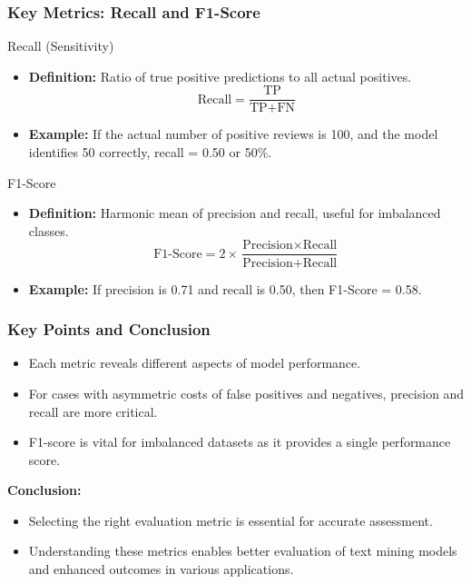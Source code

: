 \documentclass[aspectratio=169]{beamer}
\begin{document}
\begin{frame}[fragile]
    \frametitle{Key Metrics: Recall and F1-Score}
    \begin{block}{Recall (Sensitivity)}
        \begin{itemize}
            \item \textbf{Definition:} Ratio of true positive predictions to all actual positives.
            \begin{equation}
                \text{Recall} = \frac{\text{TP}}{\text{TP} + \text{FN}}
            \end{equation}
            \item \textbf{Example:} If the actual number of positive reviews is 100, and the model identifies 50 correctly, recall = 0.50 or 50\%.
        \end{itemize}
    \end{block}

    \begin{block}{F1-Score}
        \begin{itemize}
            \item \textbf{Definition:} Harmonic mean of precision and recall, useful for imbalanced classes.
            \begin{equation}
                \text{F1-Score} = 2 \times \frac{\text{Precision} \times \text{Recall}}{\text{Precision} + \text{Recall}}
            \end{equation}
            \item \textbf{Example:} If precision is 0.71 and recall is 0.50, then F1-Score = 0.58.
        \end{itemize}
    \end{block}
\end{frame}

\begin{frame}[fragile]
    \frametitle{Key Points and Conclusion}
    \begin{itemize}
        \item Each metric reveals different aspects of model performance.
        \item For cases with asymmetric costs of false positives and negatives, precision and recall are more critical.
        \item F1-score is vital for imbalanced datasets as it provides a single performance score.
    \end{itemize}
    
    \textbf{Conclusion:} 
    \begin{itemize}
        \item Selecting the right evaluation metric is essential for accurate assessment.
        \item Understanding these metrics enables better evaluation of text mining models and enhanced outcomes in various applications.
    \end{itemize}
\end{frame}
\end{document}
